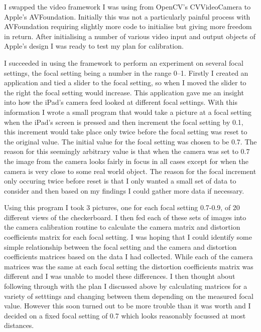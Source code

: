 \documentclass{article}
\begin{document}
I swapped the video framework I was using from OpenCV's CVVideoCamera to Apple's AVFoundation. Initially this was not a particularly painful process with AVFoundation requiring slightly more code to initialise but giving more freedom in return. After initialising a number of various video input and output objects of Apple's design I was ready to test my plan for calibration. 

I succeeded in using the framework to perform an experiment on several focal settings, the focal setting being a number in the range 0--1. Firstly I created an application and tied a slider to the focal setting, so when I moved the slider to the right the focal setting would increase. This application gave me an insight into how the iPad's camera feed looked at different focal settings. With this information I wrote a small program that would take a picture at a focal setting when the iPad's screen is pressed and then increment the focal setting by 0.1, this increment would take place only twice before the focal setting was reset to the original value. The initial value for the focal setting was chosen to be 0.7. The reason for this seemingly arbitrary value is that when the camera was set to 0.7 the image from the camera looks fairly in focus in all cases except for when the camera is very close to some real world object. The reason for the focal increment only occuring twice before reset is that I only wanted a small set of data to consider and then based on my findings I could gather more data if necessary. \par

Using this program I took 3 pictures, one for each focal setting 0.7-0.9, of 20 different views of the checkerboard. I then fed each of these sets of images into the camera calibration routine to calculate the camera matrix and distortion coefficients matrix for each focal setting. I was hoping that I could identify some simple relationship between the focal setting and the camera and distortion coefficients matrices based on the data I had collected. While each of the camera matrices was the same at each focal setting the distortion coefficients matrix was different and I was unable to model these differences. I then thought about following through with the plan I discussed above by calculating matrices for a variety of setttings and changing between them depending on the measured focal value. However this soon turned out to be more trouble than it was worth and I decided on a fixed focal setting of 0.7 which looks reasonably focussed at most distances.
\end{document}
